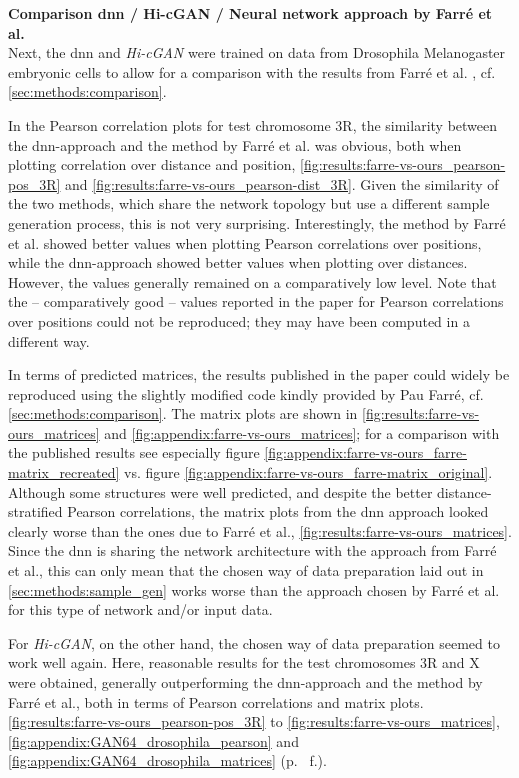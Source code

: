\textbf{Comparison \acrshort{dnn} / Hi-cGAN / Neural network approach by Farr\'e  et al.}\\
Next, the \acrshort{dnn} and \emph{Hi-cGAN} were trained on data from Drosophila Melanogaster embryonic cells
to allow for a comparison with the results from Farr\'e et al. \cite{Farre2018a}, cf. \cref{sec:methods:comparison}.

In the Pearson correlation plots for test chromosome 3R, the similarity between the \acrshort{dnn}-approach and the method by 
Farré et al. was obvious, both when plotting correlation over distance and position, \cref{fig:results:farre-vs-ours_pearson-pos_3R} 
and \ref{fig:results:farre-vs-ours_pearson-dist_3R}. 
Given the similarity of the two methods, which share the network topology but use a different sample generation process,
this is not very surprising.
Interestingly, the method by Farré et al. showed better values when plotting Pearson correlations over positions,
while the \acrshort{dnn}-approach showed better values when plotting over distances. 
However, the values generally remained on a comparatively low level.
Note that the -- comparatively good -- values reported in the paper \cite[fig.~3]{Farre2018a} for Pearson correlations over positions could not be reproduced; 
they may have been computed in a different way.

In terms of predicted matrices, the results published in the paper \cite{Farre2018a} could widely be reproduced using the slightly modified 
code kindly provided by Pau Farré, cf. \cref{sec:methods:comparison}. 
The matrix plots are shown in \cref{fig:results:farre-vs-ours_matrices} and \ref{fig:appendix:farre-vs-ours_matrices};
for a comparison with the published results see especially figure \ref{fig:appendix:farre-vs-ours_farre-matrix_recreated} vs. figure \ref{fig:appendix:farre-vs-ours_farre-matrix_original}.
Although some structures were well predicted, and despite the better distance-stratified Pearson correlations, 
the matrix plots from the \acrshort{dnn} approach looked clearly worse than the ones due to Farré et al., \cref{fig:results:farre-vs-ours_matrices}.
Since the \acrlong{dnn} is sharing the network architecture with the approach from Farr\'e et al., 
this can only mean that the chosen way of data preparation laid out in \cref{sec:methods:sample_gen} 
works worse than the approach chosen by Farré et al. for this type of network and/or input data.

For \emph{Hi-cGAN}, on the other hand, the chosen way of data preparation seemed to work well again.
Here, reasonable results for the test chromosomes 3R and X were obtained, 
generally outperforming the \acrshort{dnn}-approach and the method by Farr\'e et al., both in terms of Pearson correlations and matrix plots. 
\cref{fig:results:farre-vs-ours_pearson-pos_3R} to \ref{fig:results:farre-vs-ours_matrices}, 
\ref{fig:appendix:GAN64_drosophila_pearson} and \ref{fig:appendix:GAN64_drosophila_matrices} (p.~\pageref{fig:appendix:GAN64_drosophila_pearson} f.).

